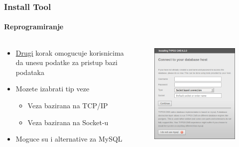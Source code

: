 
\begin{frame}[fragile]
	\frametitle{Install Tool}
	\framesubtitle{Reprogramiranje}

	\begin{columns}[T]

		\begin{column}{.5\textwidth}
			\begin{itemize}
				\item \underline{Drugi} korak omogucuje korisnicima da unesu podatke za pristup bazi podataka
				\item Mozete izabrati tip veze
					\begin{itemize}
						\item Veza bazirana na TCP/IP
						\item Veza bazirana na Socket-u
					\end{itemize}
				\item Moguce su i alternative za MySQL
			\end{itemize}
		\end{column}

		\begin{column}{.5\textwidth}
			\begin{figure}\vspace*{-0.4cm}
				\includegraphics[width=0.8\linewidth]{Images/InstallTool/DatabaseConnectionDetails.png}
			\end{figure}
		\end{column}

	\end{columns}

\end{frame}

